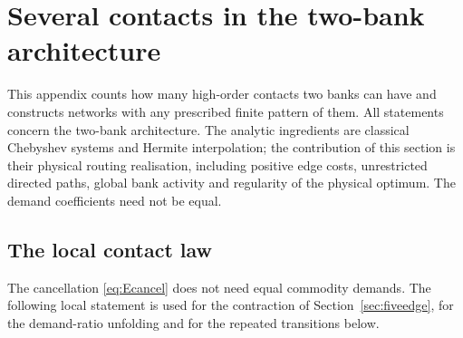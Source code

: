 \section{Several contacts in the two-bank architecture}\label{app:contacts}\label{mc:section}

This appendix counts how many high-order contacts two banks can have and constructs networks with any prescribed finite pattern of them. All statements concern the two-bank architecture. The analytic ingredients are classical Chebyshev systems and Hermite interpolation; the contribution of this section is their physical routing realisation, including positive edge costs, unrestricted directed paths, global bank activity and regularity of the physical optimum. The demand coefficients need not be equal.

\subsection{The local contact law}

The cancellation \eqref{eq:Ecancel} does not need equal commodity demands. The following local statement is used for the contraction of Section~\ref{sec:fiveedge}, for the demand-ratio unfolding and for the repeated transitions below.

